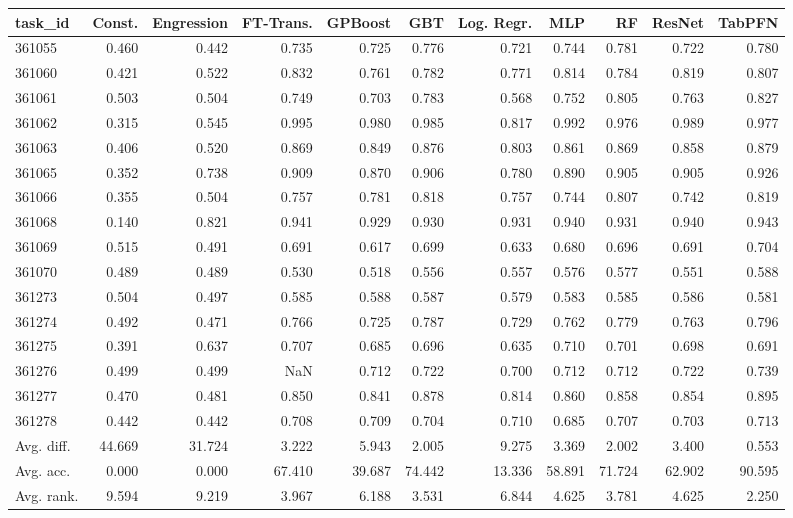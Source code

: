 \begin{tabular}{lrrrrrrrrrr}
\toprule
task\_id & Const. & Engression & FT-Trans. & GPBoost & GBT & Log. Regr. & MLP & RF & ResNet & TabPFN \\
\midrule
361055 & 0.460 & 0.442 & 0.735 & 0.725 & 0.776 & 0.721 & 0.744 & 0.781 & 0.722 & 0.780 \\
361060 & 0.421 & 0.522 & 0.832 & 0.761 & 0.782 & 0.771 & 0.814 & 0.784 & 0.819 & 0.807 \\
361061 & 0.503 & 0.504 & 0.749 & 0.703 & 0.783 & 0.568 & 0.752 & 0.805 & 0.763 & 0.827 \\
361062 & 0.315 & 0.545 & 0.995 & 0.980 & 0.985 & 0.817 & 0.992 & 0.976 & 0.989 & 0.977 \\
361063 & 0.406 & 0.520 & 0.869 & 0.849 & 0.876 & 0.803 & 0.861 & 0.869 & 0.858 & 0.879 \\
361065 & 0.352 & 0.738 & 0.909 & 0.870 & 0.906 & 0.780 & 0.890 & 0.905 & 0.905 & 0.926 \\
361066 & 0.355 & 0.504 & 0.757 & 0.781 & 0.818 & 0.757 & 0.744 & 0.807 & 0.742 & 0.819 \\
361068 & 0.140 & 0.821 & 0.941 & 0.929 & 0.930 & 0.931 & 0.940 & 0.931 & 0.940 & 0.943 \\
361069 & 0.515 & 0.491 & 0.691 & 0.617 & 0.699 & 0.633 & 0.680 & 0.696 & 0.691 & 0.704 \\
361070 & 0.489 & 0.489 & 0.530 & 0.518 & 0.556 & 0.557 & 0.576 & 0.577 & 0.551 & 0.588 \\
361273 & 0.504 & 0.497 & 0.585 & 0.588 & 0.587 & 0.579 & 0.583 & 0.585 & 0.586 & 0.581 \\
361274 & 0.492 & 0.471 & 0.766 & 0.725 & 0.787 & 0.729 & 0.762 & 0.779 & 0.763 & 0.796 \\
361275 & 0.391 & 0.637 & 0.707 & 0.685 & 0.696 & 0.635 & 0.710 & 0.701 & 0.698 & 0.691 \\
361276 & 0.499 & 0.499 & NaN & 0.712 & 0.722 & 0.700 & 0.712 & 0.712 & 0.722 & 0.739 \\
361277 & 0.470 & 0.481 & 0.850 & 0.841 & 0.878 & 0.814 & 0.860 & 0.858 & 0.854 & 0.895 \\
361278 & 0.442 & 0.442 & 0.708 & 0.709 & 0.704 & 0.710 & 0.685 & 0.707 & 0.703 & 0.713 \\
Avg. diff. & 44.669 & 31.724 & 3.222 & 5.943 & 2.005 & 9.275 & 3.369 & 2.002 & 3.400 & 0.553 \\
Avg. acc. & 0.000 & 0.000 & 67.410 & 39.687 & 74.442 & 13.336 & 58.891 & 71.724 & 62.902 & 90.595 \\
Avg. rank. & 9.594 & 9.219 & 3.967 & 6.188 & 3.531 & 6.844 & 4.625 & 3.781 & 4.625 & 2.250 \\
\bottomrule
\end{tabular}
